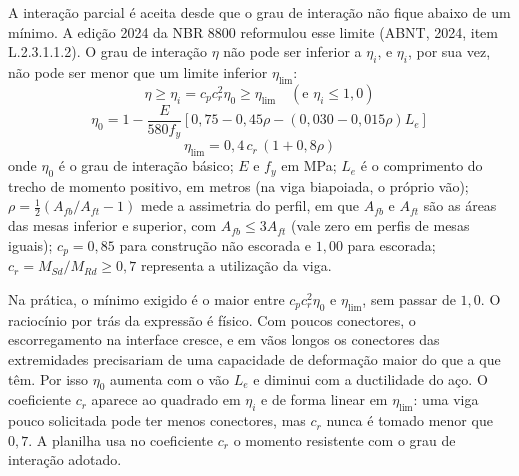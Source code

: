 \documentclass[11pt,a4paper]{article}
\begin{document}
A interação parcial é aceita desde que o grau de interação não fique abaixo de um mínimo. A edição 2024 da NBR 8800 reformulou esse limite (ABNT, 2024, item L.2.3.1.1.2). O grau de interação $\eta$ não pode ser inferior a $\eta_i$, e $\eta_i$, por sua vez, não pode ser menor que um limite inferior $\eta_{\text{lim}}$:
\begin{equation}
  \eta \ge \eta_i = c_p c_r^2 \eta_0 \ge \eta_{\text{lim}} \quad (\text{e } \eta_i \le 1{,}0)
  \label{eq:etai}
\end{equation}
\begin{equation}
  \eta_0 = 1 - \frac{E}{580 f_y}\left[0{,}75 - 0{,}45\rho - (0{,}030 - 0{,}015\rho) L_e\right]
  \label{eq:eta0}
\end{equation}
\begin{equation}
  \eta_{\text{lim}} = 0{,}4\, c_r\, (1 + 0{,}8\rho)
  \label{eq:etalim}
\end{equation}
onde $\eta_0$ é o grau de interação básico; $E$ e $f_y$ em MPa; $L_e$ é o comprimento do trecho de momento positivo, em metros (na viga biapoiada, o próprio vão); $\rho = \frac{1}{2}(A_{fb}/A_{ft} - 1)$ mede a assimetria do perfil, em que $A_{fb}$ e $A_{ft}$ são as áreas das mesas inferior e superior, com $A_{fb} \le 3 A_{ft}$ (vale zero em perfis de mesas iguais); $c_p = 0{,}85$ para construção não escorada e $1{,}00$ para escorada; $c_r = M_{Sd}/M_{Rd} \ge 0{,}7$ representa a utilização da viga.

Na prática, o mínimo exigido é o maior entre $c_p c_r^2 \eta_0$ e $\eta_{\text{lim}}$, sem passar de $1{,}0$. O raciocínio por trás da expressão é físico. Com poucos conectores, o escorregamento na interface cresce, e em vãos longos os conectores das extremidades precisariam de uma capacidade de deformação maior do que a que têm. Por isso $\eta_0$ aumenta com o vão $L_e$ e diminui com a ductilidade do aço. O coeficiente $c_r$ aparece ao quadrado em $\eta_i$ e de forma linear em $\eta_{\text{lim}}$: uma viga pouco solicitada pode ter menos conectores, mas $c_r$ nunca é tomado menor que $0{,}7$. A planilha usa no coeficiente $c_r$ o momento resistente com o grau de interação adotado.
\end{document}
